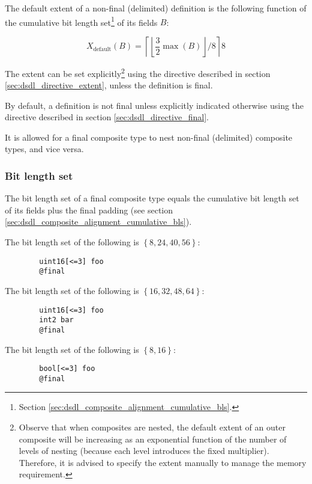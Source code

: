 The default extent of a non-final (delimited) definition is the following function
of the cumulative bit length set\footnote{Section \ref{sec:dsdl_composite_alignment_cumulative_bls}.}
of its fields $B$:

$$
X_\text{default}\left(B\right) =
\left\lceil{}\left\lfloor{}\frac{3}{2} \max{}\left(B\right)\right\rfloor{}/8\right\rceil{}8
$$

The extent can be set explicitly\footnote{
    Observe that when composites are nested,
    the default extent of an outer composite will be increasing as an exponential
    function of the number of levels of nesting (because each level introduces the fixed multiplier).
    Therefore, it is advised to specify the extent manually to manage the memory requirement.
}
using the directive described in section \ref{sec:dsdl_directive_extent},
unless the definition is final.

By default, a definition is not final unless explicitly indicated otherwise using the directive described in
section \ref{sec:dsdl_directive_final}.

It is allowed for a final composite type to nest non-final (delimited) composite types, and vice versa.

\subsubsection{Bit length set}

The bit length set of a final composite type equals the cumulative bit length set
of its fields plus the final padding (see section \ref{sec:dsdl_composite_alignment_cumulative_bls}).

\begin{remark}
    The bit length set of the following is $\left\{ 8, 24, 40, 56 \right\}$:
    \begin{verbatim}
        uint16[<=3] foo
        @final
    \end{verbatim}

    The bit length set of the following is $\left\{ 16, 32, 48, 64 \right\}$:
    \begin{verbatim}
        uint16[<=3] foo
        int2 bar
        @final
    \end{verbatim}

    The bit length set of the following is $\left\{ 8, 16 \right\}$:
    \begin{verbatim}
        bool[<=3] foo
        @final
    \end{verbatim}
\end{remark}

